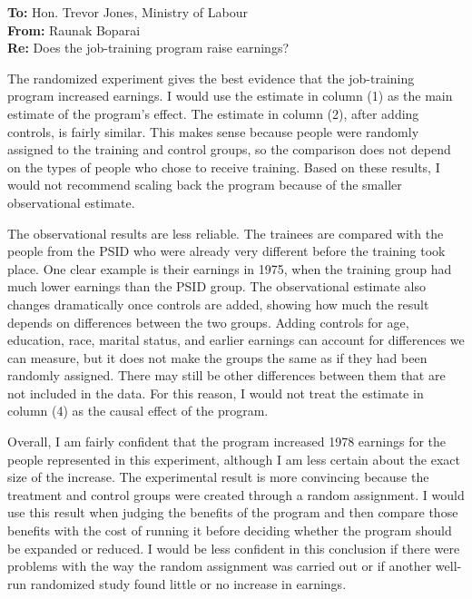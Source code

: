 \documentclass[11pt]{article}
\begin{document}
\begin{flushleft}
\textbf{To:} Hon. Trevor Jones, Ministry of Labour \\
\textbf{From:} Raunak Boparai \\
\textbf{Re:} Does the job-training program raise earnings? \\
\hrulefill
\end{flushleft}

The randomized experiment gives the best evidence that the job-training program increased earnings. I would use the estimate in column (1) as the main estimate of the program's effect. The estimate in column (2), after adding controls, is fairly similar. This makes sense because people were randomly assigned to the training and control groups, so the comparison does not depend on the types of people who chose to receive training. Based on these results, I would not recommend scaling back the program because of the smaller observational estimate.

\bigskip
The observational results are less reliable. The trainees are compared with the people from the PSID who were already very different before the training took place. One clear example is their earnings in 1975, when the training group had much lower earnings than the PSID group. The observational estimate also changes dramatically once controls are added, showing how much the result depends on differences between the two groups. Adding controls for age, education, race, marital status, and earlier earnings can account for differences we can measure, but it does not make the groups the same as if they had been randomly assigned. There may still be other differences between them that are not included in the data. For this reason, I would not treat the estimate in column (4) as the causal effect of the program.

\bigskip
Overall, I am fairly confident that the program increased 1978 earnings for the people represented in this experiment, although I am less certain about the exact size of the increase. The experimental result is more convincing because the treatment and control groups were created through a random assignment. I would use this result when judging the benefits of the program and then compare those benefits with the cost of running it before deciding whether the program should be expanded or reduced. I would be less confident in this conclusion if there were problems with the way the random assignment was carried out or if another well-run randomized study found little or no increase in earnings.

\bigskip


\bigskip
\end{document}
